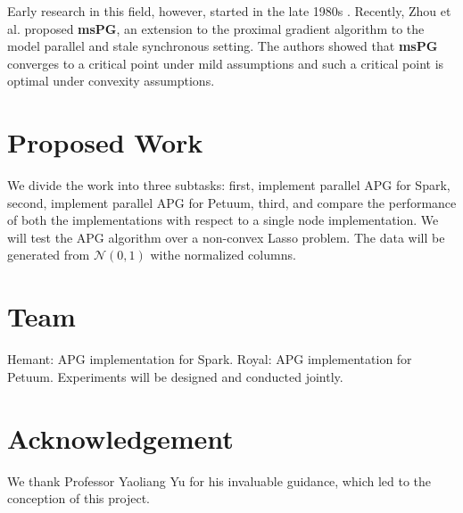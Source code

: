 \documentclass{article}
\begin{document}
Early research in this field, however, started in the late 
1980s \cite{bertsekas1989convergence,bertsekas1989parallel,tseng1991rate,tsitsiklis1984distributed}. 
Recently, Zhou et al. proposed \textbf{msPG}, 
an extension to the proximal gradient algorithm to the model parallel and stale synchronous setting\cite{zhou2016convergence}. 
The authors showed that \textbf{msPG} converges to a critical point under mild assumptions 
and such a critical point is optimal under convexity assumptions.

\section{Proposed Work}
We divide the work into three subtasks: first, implement parallel APG for Spark, second, implement parallel APG for Petuum, 
third, and compare the performance of both the implementations with respect to a single node implementation.
We will test the APG algorithm over a non-convex Lasso problem.
The data will be generated from $\mathcal{N}(0,1)$ withe normalized columns.
 
\section{Team}
Hemant: APG implementation for Spark.
Royal: APG implementation for Petuum.
Experiments will be designed and conducted jointly.

\section*{Acknowledgement}
We thank Professor Yaoliang Yu for his invaluable guidance, which led to the conception of this project.



\end{document}

